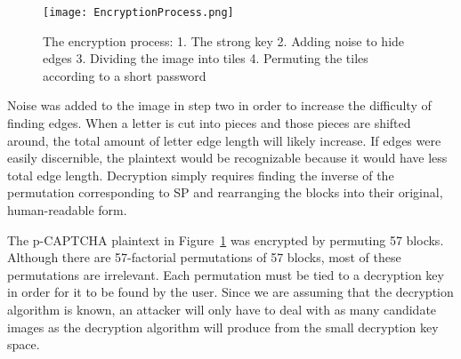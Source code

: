 \documentclass[12pt]{article}
\begin{document}
\begin{figure}
	\begin{center}
		\texttt{[image: EncryptionProcess.png]}
	\end{center}
	\caption{The encryption process: 1. The strong key 2. Adding noise to hide edges 3. Dividing the image into tiles 4. Permuting the tiles according to a short password}
\label{EncryptionProcess}
\end{figure}

Noise was added to the image in step two in order to increase the difficulty of finding edges. When a letter is cut into pieces and those pieces are shifted around, the total amount of letter edge length will likely increase. If edges were easily discernible, the plaintext would be recognizable because it would have less total edge length. Decryption simply requires finding the inverse of the permutation corresponding to SP and rearranging the blocks into their original, human-readable form.

The p-CAPTCHA plaintext in Figure~{\ref{EncryptionProcess}} was encrypted by permuting 57 blocks. Although there are 57-factorial permutations of 57 blocks, most of these permutations are irrelevant. Each permutation must be tied to a decryption key in order for it to be found by the user. Since we are assuming that the decryption algorithm is known, an attacker will only have to deal with as many candidate images as the decryption algorithm will produce from the small decryption key space.
\end{document}
